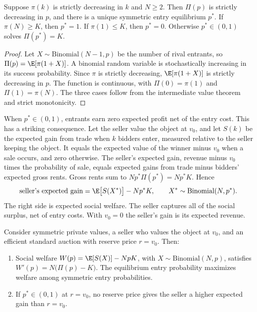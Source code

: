 \begin{proposition}\label{prop:14-ls-unique}
Suppose $\pi(k)$ is strictly decreasing in $k$ and $N\ge 2$. Then $\Pi(p)$ is strictly decreasing in
$p$, and there is a unique symmetric entry equilibrium $p^*$. If $\pi(N)\ge K$, then $p^*=1$. If
$\pi(1)\le K$, then $p^*=0$. Otherwise $p^*\in(0,1)$ solves $\Pi(p^*)=K$.
\end{proposition}

\begin{proof}
Let $X\sim\text{Binomial}(N-1,p)$ be the number of rival entrants, so $\Pi(p)=\E[\pi(1+X)]$. A
binomial random variable is stochastically increasing in its success probability. Since $\pi$ is
strictly decreasing, $\E[\pi(1+X)]$ is strictly decreasing in $p$. The function is continuous, with
$\Pi(0)=\pi(1)$ and $\Pi(1)=\pi(N)$. The three cases follow from the intermediate value theorem and
strict monotonicity.
\end{proof}

When $p^*\in(0,1)$, entrants earn zero expected profit net of the entry cost. This has a striking
consequence. Let the seller value the object at $v_0$, and let $S(k)$ be the expected gain from trade
when $k$ bidders enter, measured relative to the seller keeping the object. It equals the expected
value of the winner minus $v_0$ when a sale occurs, and zero otherwise. The seller's expected gain,
revenue minus $v_0$ times the probability of sale, equals expected gains from trade minus bidders'
expected gross rents. Gross rents sum to $Np^*\Pi(p^*)=Np^*K$. Hence
\begin{equation}\label{eq:14-ls-revenue}
\text{seller's expected gain}=\E\bigl[S(X^*)\bigr]-Np^*K,\qquad X^*\sim\text{Binomial}(N,p^*).
\end{equation}
The right side is expected social welfare. The seller captures all of the social surplus, net of
entry costs. With $v_0=0$ the seller's gain is its expected revenue.

\begin{proposition}\label{prop:14-ls-welfare}
Consider symmetric private values, a seller who values the object at $v_0$, and an efficient standard
auction with reserve price $r=v_0$. Then:
\begin{enumerate}[label=(\roman*)]
\item Social welfare $W(p)=\E[S(X)]-NpK$, with $X\sim\text{Binomial}(N,p)$, satisfies
$W'(p)=N\bigl(\Pi(p)-K\bigr)$. The equilibrium entry probability maximizes welfare among symmetric
entry probabilities.
\item If $p^*\in(0,1)$ at $r=v_0$, no reserve price gives the seller a higher expected gain than
$r=v_0$.
\end{enumerate}
\end{proposition}


